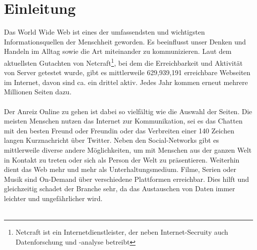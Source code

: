 %
%
%
%


\chapter{Einleitung}

Das World Wide Web ist eines der umfassendsten und wichtigsten Informationsquellen der Menschheit geworden. Es beeinflusst unser Denken und Handeln im Alltag sowie die Art miteinander zu kommunizieren. Laut dem aktuellsten Gutachten\cite{websurvey} von Netcraft\footnote{Netcraft ist ein Internetdienstleister, der neben Internet-Secruity auch Datenforschung und -analyse betreibt}, bei dem die Erreichbarkeit und Aktivität von Server getestet wurde, gibt es mittlerweile 629,939,191 erreichbare Webseiten im Internet, davon sind ca. ein drittel aktiv. Jedes Jahr kommen erneut mehrere Millionen Seiten dazu.\\
\\
Der Anreiz \glqq Online zu gehen\grqq{} ist dabei so vielfältig wie die Auswahl der Seiten. Die meisten Menschen nutzen das Internet zur Kommunikation, sei es das Chatten mit den besten Freund oder Freundin oder das Verbreiten einer 140 Zeichen langen Kurznachricht über Twitter. Neben den Social-Networks gibt es mittlerweile diverse andere Möglichkeiten, um mit Menschen aus der ganzen Welt in Kontakt zu treten oder sich als Person der Welt zu präsentieren. Weiterhin dient das Web mehr und mehr als Unterhaltungsmedium. Filme, Serien oder Musik sind \Gls{On-Demand} über verschiedene Plattformen erreichbar. Dies hilft und gleichzeitig schadet der Branche sehr, da das Austauschen von Daten immer leichter und ungefährlicher wird.\\
\\
